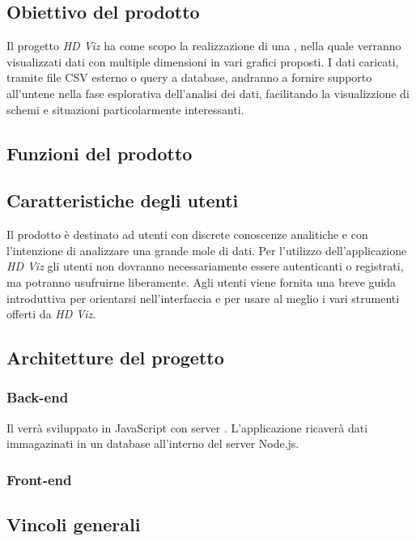 \documentclass[../analisi-dei-requisiti.tex]{subfiles}
\begin{document}
\subsection{Obiettivo del prodotto}
\label{subs:obiettivo_del_prodotto}
Il progetto \emph{HD Viz} ha come scopo la realizzazione di una , nella quale verranno visualizzati dati con multiple dimensioni in vari grafici proposti.
I dati caricati, tramite file CSV esterno o query a database, andranno a fornire supporto all'untene nella fase esplorativa dell'analisi dei dati, facilitando la visualizzione di schemi e situazioni particolarmente interessanti.


\subsection{Funzioni del prodotto}
\label{subs:funzioni_del_prodotto}


\subsection{Caratteristiche degli utenti}
\label{subs:caratteristiche_degli_utenti}
Il prodotto è destinato ad utenti con discrete conoscenze analitiche e con l'intenzione di analizzare una grande mole di dati.
Per l'utilizzo dell'applicazione \emph{HD Viz} gli utenti non dovranno necessariamente essere autenticanti o registrati, ma potranno usufruirne liberamente.
Agli utenti viene fornita una breve guida introduttiva per orientarsi nell'interfaccia e per usare al meglio i vari strumenti offerti da \emph{HD Viz}.

\subsection{Architetture del progetto}
\label{subs:architetture_e_tecnologie_del_progetto}
\subsubsection{Back-end}
Il  verrà sviluppato in JavaScript con server . L'applicazione ricaverà dati immagazinati in un database  all'interno del server Node.js.


\subsubsection{Front-end}


\subsection{Vincoli generali}
\label{subs:vincoli_generali}
\end{document}
